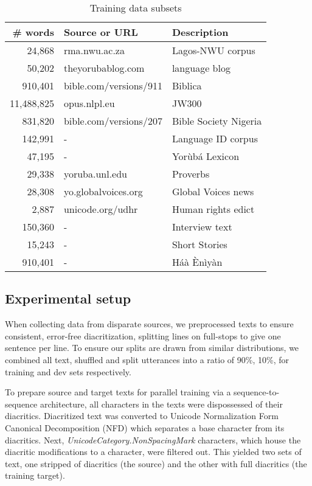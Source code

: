 \documentclass{article} %
\begin{document}
 \begin{table}[h]
  \caption{Training data subsets}
  \label{tab:training_datasets}
  \centering
  \begin{tabular}{rll}
    \toprule
    \textbf{\# words} & \textbf{Source or URL}  & \textbf{Description} \\
    \midrule
    24,868 & rma.nwu.ac.za  & Lagos-NWU corpus \\  
    50,202 & theyorubablog.com & language blog\\  
    910,401 & bible.com/versions/911 & Biblica \\
    \midrule
    11,488,825 & opus.nlpl.eu & JW300 \\
    831,820 & bible.com/versions/207 & Bible Society Nigeria \\
    142,991 & - & Language ID corpus \\
    47,195 & - & Yor{\`u}b{\'a} Lexicon \\
    29,338 & yoruba.unl.edu & Proverbs \\
    28,308 & yo.globalvoices.org & Global Voices news \\
    2,887 & unicode.org/udhr & Human rights edict \\

    \midrule
    150,360 & - & Interview text \\
    15,243 & - & Short Stories \\
    910,401 & - & Háà Ènìyàn \\

    \bottomrule
  \end{tabular}
\end{table}

\subsection{Experimental setup}\label{sec:experimental}
When collecting data from disparate sources, we preprocessed texts to ensure consistent, error-free diacritization, splitting lines on full-stops to give one sentence per line. To ensure our splits are drawn from similar distributions, we combined all text, shuffled and split utterances into a ratio of 90\%, 10\%, for training and dev sets respectively.  

To prepare source and target texts for parallel training via a sequence-to-sequence architecture, all characters in the texts were dispossessed of their diacritics. Diacritized text was converted to Unicode Normalization Form Canonical Decomposition (NFD) which separates a base character from its diacritics. Next, \emph{UnicodeCategory.NonSpacingMark} characters, which house the diacritic modifications to a character, were filtered out. This yielded two sets of text, one stripped of diacritics (the source) and the other with full diacritics (the training target). 
\end{document}
